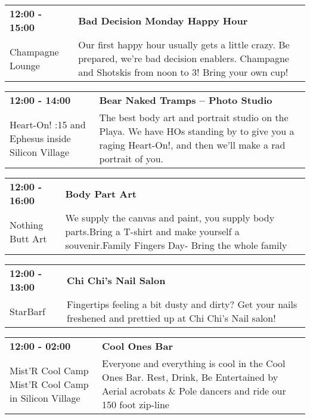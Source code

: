 \begin{tabular}{ p{1in} p{2.2in} }
    \textbf{12:00 - 15:00} & \textbf{Bad Decision Monday Happy Hour} \\
    Champagne Lounge \newline  & Our first happy hour usually gets a little crazy. Be prepared, we're bad decision enablers. Champagne and Shotskis from noon to 3! Bring your own cup! \\
    \hline 
\end{tabular}
    
\begin{tabular}{ p{1in} p{2.2in} }
    \textbf{12:00 - 14:00} & \textbf{Bear Naked Tramps -- Photo Studio} \\
    Heart-On! \newline 6:15 and Ephesus inside Silicon Village & The best body art and portrait studio on the Playa. We have HOs standing by to give you a raging Heart-On!, and then we'll make a rad portrait of you. \\
    \hline 
\end{tabular}
    
\begin{tabular}{ p{1in} p{2.2in} }
    \textbf{12:00 - 16:00} & \textbf{Body Part Art} \\
    Nothing Butt Art \newline  & We supply the canvas and paint, you supply body parts.Bring a T-shirt and make yourself a souvenir.Family Fingers Day- Bring the whole family \\
    \hline 
\end{tabular}
    
\begin{tabular}{ p{1in} p{2.2in} }
    \textbf{12:00 - 13:00} & \textbf{Chi Chi's Nail Salon} \\
    StarBarf \newline  & Fingertips feeling a bit dusty and dirty? Get your nails freshened and prettied up at Chi Chi's Nail salon! \\
    \hline 
\end{tabular}
    
\begin{tabular}{ p{1in} p{2.2in} }
    \textbf{12:00 - 02:00} & \textbf{Cool Ones Bar } \\
    Mist'R Cool Camp \newline Mist'R Cool Camp in Silicon Village & Everyone and everything is cool in the Cool Ones Bar. Rest, Drink, Be Entertained by Aerial acrobats \& Pole dancers and ride our 150 foot zip-line \\
    \hline 
\end{tabular}
    
